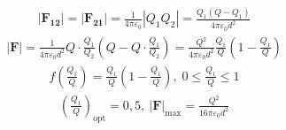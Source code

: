 \begin{align*}
    |\mathbf{F_{12}}| = |\mathbf{F_{21}}| = \frac{1}{4\pi\varepsilon_0} |Q_1Q_2| 
    = \frac{Q_1(Q-Q_1)}{4\pi\varepsilon_0 d^2}
\end{align*}
\begin{align*}
    |\mathbf{F}| = \frac{1}{4\pi\varepsilon_0d^2}Q\cdot \frac{Q_1}{Q_2}\left(Q - Q\cdot\frac{Q_1}{Q_2}\right) 
    = \frac{Q^2}{4\pi\varepsilon_0d^2}\frac{Q_1}{Q}\left(1 - \frac{Q_1}{Q}\right)
\end{align*}
\begin{align*}
    f\left(\frac{Q_1}{Q}\right) = \frac{Q_1}{Q}\left(1 - \frac{Q_1}{Q}\right),\; 0 \leq \frac{Q_1}{Q} \leq 1
\end{align*}
\begin{align*}
    \boxed{\left(\frac{Q_1}{Q}\right)_\mathrm{opt} = 0,5},\ 
    \boxed{\mathbf{|F|}_\mathrm{max} = \frac{Q^2}{16\pi\varepsilon_0 d^2}}
\end{align*}
\begin{figure}[h]
    \centering
    
\end{figure}